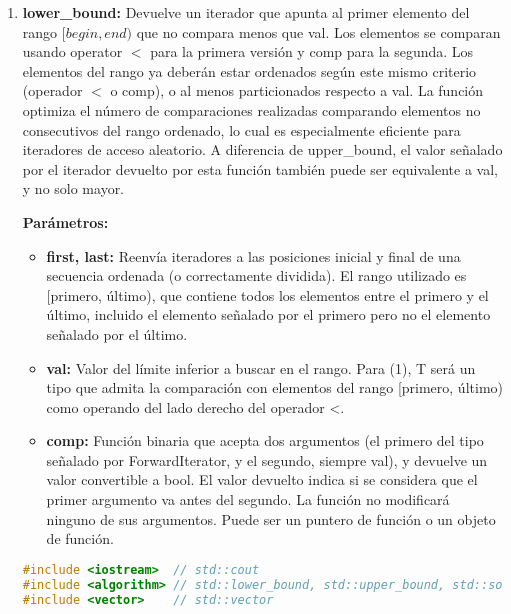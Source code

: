 \begin{enumerate}
\begin{lstlisting}[language=C++]
   // usando mi funcion como comparacion:
   std::sort (v.begin(), v.end(), myfunction);
	
   std::cout << "buscando un 6... ";
   if (std::binary_search (v.begin(), v.end(), 6, myfunction))
   std::cout << "encontrado!\n"; else std::cout << "no encontrado.\n";
	
   return 0;
}
\end{lstlisting}


\item \textbf{lower\_bound:} Devuelve un iterador que apunta al primer elemento del rango $[begin, end)$ que no compara menos que val. Los elementos se comparan usando operator $<$ para la primera versión y comp para la segunda. Los elementos del rango ya deberán estar ordenados según este mismo criterio (operador $<$ o comp), o al menos particionados respecto a val. La función optimiza el número de comparaciones realizadas comparando elementos no consecutivos del rango ordenado, lo cual es especialmente eficiente para iteradores de acceso aleatorio. A diferencia de upper\_bound, el valor señalado por el iterador devuelto por esta función también puede ser equivalente a val, y no solo mayor.

\textbf{Parámetros:}

\begin{itemize}
	\item \textbf{first, last:} Reenvía iteradores a las posiciones inicial y final de una secuencia ordenada (o correctamente dividida). El rango utilizado es [primero, último), que contiene todos los elementos entre el primero y el último, incluido el elemento señalado por el primero pero no el elemento señalado por el último.
	
	
	\item \textbf{val:} Valor del límite inferior a buscar en el rango.
	Para (1), T será un tipo que admita la comparación con elementos del rango [primero, último) como operando del lado derecho del operador <.
	
	\item \textbf{comp:}  Función binaria que acepta dos argumentos (el primero del tipo señalado por ForwardIterator, y el segundo, siempre val), y devuelve un valor convertible a bool. El valor devuelto indica si se considera que el primer argumento va antes del segundo. La función no modificará ninguno de sus argumentos. Puede ser un puntero de función o un objeto de función.
\end{itemize} 

\begin{lstlisting}[language=C++]
#include <iostream>  // std::cout
#include <algorithm> // std::lower_bound, std::upper_bound, std::sort
#include <vector>    // std::vector


\end{lstlisting}
\end{enumerate}
